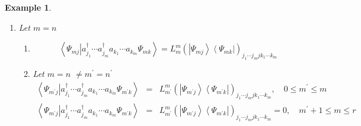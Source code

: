 \documentclass[aps,preprint]{revtex4}
\newtheorem{example}[theorem]{Example}
\begin{document}
\begin{enumerate}
\begin{example}
\begin{enumerate}
\begin{eqnarray}
{{{}{m}  \\ 1\leq k\leq \binom{r}{m}}}\left\vert \Psi _{m^{\prime
}j}\right\rangle \left\langle \Psi _{n^{\prime }k}\right\vert \left\langle
\left. \Psi _{m^{\prime }j}\right\vert a_{j_{1}}^{\dagger }\cdots
a_{j_{m}}^{\dagger }a_{k_{1}}\cdots a_{k_{n}}\Psi _{n^{\prime
}k}\right\rangle \\
&=&\sum_{\substack{ 1\leq j\leq \binom{r}{m}  \\ 1\leq k\leq \binom{r}{m}}}%
\left\vert \Psi _{m^{\prime }j}\right\rangle \left\langle \Psi _{n^{\prime
}k}\right\vert L_{m^{\prime }n^{\prime }}^{mn}\left( \left\vert \Psi
_{m^{\prime }j}\right\rangle \left\langle \Psi _{n^{\prime }k}\right\vert
\right) _{j_{1}\cdots j_{m}k_{1}\cdots k_{m}}.
\end{eqnarray}%
\textbf{where the Reduced Transition matrix elements are given by} 
\begin{equation}
L_{m^{\prime }n^{\prime }}^{mn}\left( \left\vert \Psi _{m^{\prime
}j}\right\rangle \left\langle \Psi _{n^{\prime }k}\right\vert \right)
_{j_{1}\cdots j_{m}k_{1}\cdots k_{m}}=\left\langle \left. \Psi _{m^{\prime
}j}\right\vert a_{j_{1}}^{\dagger }\cdots a_{j_{m}}^{\dagger
}a_{k_{1}}\cdots a_{k_{n}}\Psi _{n^{\prime }k}\right\rangle .
\end{equation}

\item Let $m=n$

\begin{enumerate}
\item 
\begin{equation}
\left\langle \left. \Psi _{mj}\right\vert a_{j_{1}}^{\dagger }\cdots
a_{j_{m}}^{\dagger }a_{k_{1}}\cdots a_{k_{m}}\Psi _{mk}\right\rangle
=L_{m}^{m}\left( \left\vert \Psi _{mj}\right\rangle \left\langle \Psi
_{mk}\right\vert \right) _{j_{1}\cdots j_{m}jk_{1}\cdots k_{m}}
\end{equation}

\item Let $m=n$ $\neq m^{\prime }=n^{\prime }$ 
\begin{eqnarray}
\left\langle \left. \Psi _{m^{\prime }j}\right\vert a_{j_{1}}^{\dagger
}\cdots a_{j_{m}}^{\dagger }a_{k_{1}}\cdots a_{k_{m}}\Psi _{m^{\prime
}k}\right\rangle &=&L_{m^{\prime }}^{m}\left( \left\vert \Psi _{m^{\prime
}j}\right\rangle \left\langle \Psi _{m^{\prime }k}\right\vert \right)
_{j_{1}\cdots j_{m}jk_{1}\cdots k_{m}},\quad 0\leq m^{\prime }\leq m \\
\left\langle \left. \Psi _{m^{\prime }j}\right\vert a_{j_{1}}^{\dagger
}\cdots a_{j_{m}}^{\dagger }a_{k_{1}}\cdots a_{k_{m}}\Psi _{m^{\prime
}k}\right\rangle &=&L_{m^{\prime }}^{m}\left( \left\vert \Psi _{m^{\prime
}j}\right\rangle \left\langle \Psi _{m^{\prime }k}\right\vert \right)
_{j_{1}\cdots j_{m}jk_{1}\cdots k_{m}}=0,\quad m^{\prime }+1\leq m\leq r
\end{eqnarray}


\end{enumerate}
\end{enumerate}
\end{example}
\end{enumerate}
\end{document}
